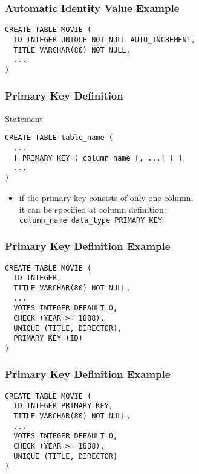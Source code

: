 \documentclass[dvipsnames]{beamer}
\theoremstyle{plain}
\begin{document}
\begin{frame}[fragile]
  \frametitle{Automatic Identity Value Example}

  \begin{example}[MySQL]
    \begin{lstlisting}
CREATE TABLE MOVIE (
  ID INTEGER UNIQUE NOT NULL AUTO_INCREMENT,
  TITLE VARCHAR(80) NOT NULL,
  ...
)
    \end{lstlisting}
  \end{example}
\end{frame}

\begin{frame}[fragile]
  \frametitle{Primary Key Definition}

  \begin{block}{Statement}
    \begin{lstlisting}
CREATE TABLE table_name (
  ...
  [ PRIMARY KEY ( column_name [, ...] ) ]
  ...
)
    \end{lstlisting}
  \end{block}

  \begin{itemize}
    \item if the primary key consists of only one column,\\
      it can be specified at column definition:\\
      \lstinline!column_name data_type PRIMARY KEY!
  \end{itemize}
\end{frame}

\begin{frame}[fragile]
  \frametitle{Primary Key Definition Example}

  \begin{example}
    \begin{lstlisting}
CREATE TABLE MOVIE (
  ID INTEGER,
  TITLE VARCHAR(80) NOT NULL,
  ...
  VOTES INTEGER DEFAULT 0,
  CHECK (YEAR >= 1888),
  UNIQUE (TITLE, DIRECTOR),
  PRIMARY KEY (ID)
)
    \end{lstlisting}
  \end{example}
\end{frame}

\begin{frame}[fragile]
  \frametitle{Primary Key Definition Example}

  \begin{example}
    \begin{lstlisting}
CREATE TABLE MOVIE (
  ID INTEGER PRIMARY KEY,
  TITLE VARCHAR(80) NOT NULL,
  ...
  VOTES INTEGER DEFAULT 0,
  CHECK (YEAR >= 1888),
  UNIQUE (TITLE, DIRECTOR)
)
    \end{lstlisting}
  \end{example}
\end{frame}
\end{document}
